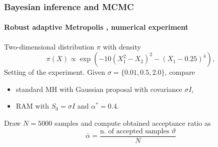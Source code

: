 \documentclass{beamer}
\begin{document}
\begin{frame}
	\frametitle{Bayesian inference and MCMC}
	\framesubtitle{Robust adaptive Metropolis \cite{Vih12}, numerical experiment}
	
	Two-dimensional distribution $\pi$ with density \cite{KaS05}
	\begin{equation*}
		\pi(X) \propto \exp(-10(X_1^2 - X_2)^2 - (X_1 - 0.25)^4),
	\end{equation*}
	Setting of the experiment. Given $\sigma = \{0.01, 0.5, 2.0\}$, compare
	\begin{itemize}
		\item standard MH with Gaussian proposal with covariance $\sigma I$,
		\item RAM with $S_0 = \sigma I$ and $\alpha^* = 0.4$.
	\end{itemize}
	Draw $N = 5000$ samples and compute obtained acceptance ratio as
	\begin{equation*}
		\bar \alpha = \frac{\text{n. of accepted samples } \vartheta}{N}
	\end{equation*}
\end{frame}
\end{document}
